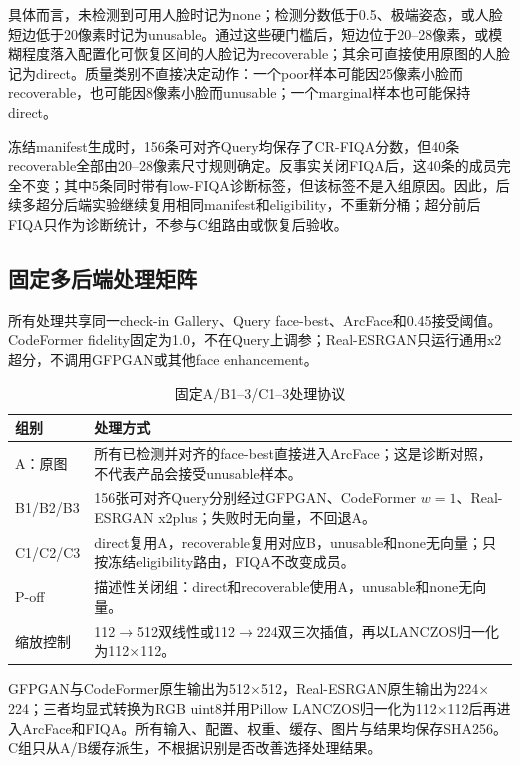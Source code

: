 \documentclass[UTF8,a4paper,11pt]{ctexart}
\begin{document}
具体而言，未检测到可用人脸时记为none；检测分数低于0.5、极端姿态，或人脸短边低于20像素时记为unusable。通过这些硬门槛后，短边位于20--28像素，或模糊程度落入配置化可恢复区间的人脸记为recoverable；其余可直接使用原图的人脸记为direct。质量类别不直接决定动作：一个poor样本可能因25像素小脸而recoverable，也可能因8像素小脸而unusable；一个marginal样本也可能保持direct。

冻结manifest生成时，156条可对齐Query均保存了CR-FIQA分数，但40条recoverable全部由20--28像素尺寸规则确定。反事实关闭FIQA后，这40条的成员完全不变；其中5条同时带有low-FIQA诊断标签，但该标签不是入组原因。因此，后续多超分后端实验继续复用相同manifest和eligibility，不重新分桶；超分前后FIQA只作为诊断统计，不参与C组路由或恢复后验收。

\subsection{固定多后端处理矩阵}

所有处理共享同一check-in Gallery、Query face-best、ArcFace和0.45接受阈值。CodeFormer fidelity固定为1.0，不在Query上调参\cite{codeformer}；Real-ESRGAN只运行通用x2超分，不调用GFPGAN或其他face enhancement\cite{realesrgan}。

\begin{table}[H]
\centering
\caption{固定A/B1--3/C1--3处理协议}
\label{tab:protocol}
\renewcommand{\arraystretch}{1.2}
\begin{tabular}{p{}p{}}
\toprule
组别 & 处理方式\\
\midrule
A：原图 & 所有已检测并对齐的face-best直接进入ArcFace；这是诊断对照，不代表产品会接受unusable样本。\\
B1/B2/B3 & 156张可对齐Query分别经过GFPGAN、CodeFormer $w=1$、Real-ESRGAN x2plus；失败时无向量，不回退A。\\
C1/C2/C3 & direct复用A，recoverable复用对应B，unusable和none无向量；只按冻结eligibility路由，FIQA不改变成员。\\
P-off & 描述性关闭组：direct和recoverable使用A，unusable和none无向量。\\
缩放控制 & 112$\rightarrow$512双线性或112$\rightarrow$224双三次插值，再以LANCZOS归一化为112$\times$112。\\
\bottomrule
\end{tabular}
\end{table}

GFPGAN与CodeFormer原生输出为512$\times$512，Real-ESRGAN原生输出为224$\times$224；三者均显式转换为RGB uint8并用Pillow LANCZOS归一化为112$\times$112后再进入ArcFace和FIQA。所有输入、配置、权重、缓存、图片与结果均保存SHA256。C组只从A/B缓存派生，不根据识别是否改善选择处理结果。
\end{document}
